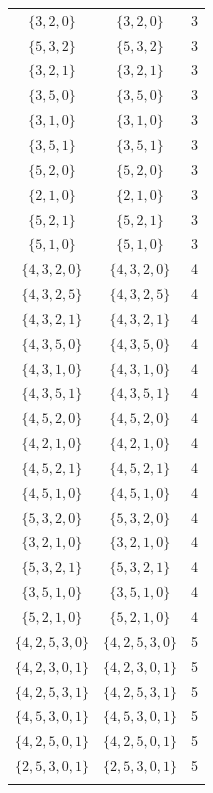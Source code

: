 \begin{longtable}{|c|c|c|}
	$\{3,2,0\}$ & $\{3,2,0\}$ & 3 \\
	$\{5,3,2\}$ & $\{5,3,2\}$ & 3 \\
	$\{3,2,1\}$ & $\{3,2,1\}$ & 3 \\
	$\{3,5,0\}$ & $\{3,5,0\}$ & 3 \\
	$\{3,1,0\}$ & $\{3,1,0\}$ & 3 \\
	$\{3,5,1\}$ & $\{3,5,1\}$ & 3 \\
	$\{5,2,0\}$ & $\{5,2,0\}$ & 3 \\
	$\{2,1,0\}$ & $\{2,1,0\}$ & 3 \\
	$\{5,2,1\}$ & $\{5,2,1\}$ & 3 \\
	$\{5,1,0\}$ & $\{5,1,0\}$ & 3 \\
	$\{4,3,2,0\}$ & $\{4,3,2,0\}$ & 4 \\
	$\{4,3,2,5\}$ & $\{4,3,2,5\}$ & 4 \\
	$\{4,3,2,1\}$ & $\{4,3,2,1\}$ & 4 \\
	$\{4,3,5,0\}$ & $\{4,3,5,0\}$ & 4 \\
	$\{4,3,1,0\}$ & $\{4,3,1,0\}$ & 4 \\
	$\{4,3,5,1\}$ & $\{4,3,5,1\}$ & 4 \\
	$\{4,5,2,0\}$ & $\{4,5,2,0\}$ & 4 \\
	$\{4,2,1,0\}$ & $\{4,2,1,0\}$ & 4 \\
	$\{4,5,2,1\}$ & $\{4,5,2,1\}$ & 4 \\
	$\{4,5,1,0\}$ & $\{4,5,1,0\}$ & 4 \\
	$\{5,3,2,0\}$ & $\{5,3,2,0\}$ & 4 \\
	$\{3,2,1,0\}$ & $\{3,2,1,0\}$ & 4 \\
	$\{5,3,2,1\}$ & $\{5,3,2,1\}$ & 4 \\
	$\{3,5,1,0\}$ & $\{3,5,1,0\}$ & 4 \\
	$\{5,2,1,0\}$ & $\{5,2,1,0\}$ & 4 \\
	$\{4,2,5,3,0\}$ & $\{4,2,5,3,0\}$ & 5 \\
	$\{4,2,3,0,1\}$ & $\{4,2,3,0,1\}$ & 5 \\
	$\{4,2,5,3,1\}$ & $\{4,2,5,3,1\}$ & 5 \\
	$\{4,5,3,0,1\}$ & $\{4,5,3,0,1\}$ & 5 \\
	$\{4,2,5,0,1\}$ & $\{4,2,5,0,1\}$ & 5 \\
	$\{2,5,3,0,1\}$ & $\{2,5,3,0,1\}$ & 5 \\
	\hline
	\label{tab:A1-domi}
\end{longtable}

